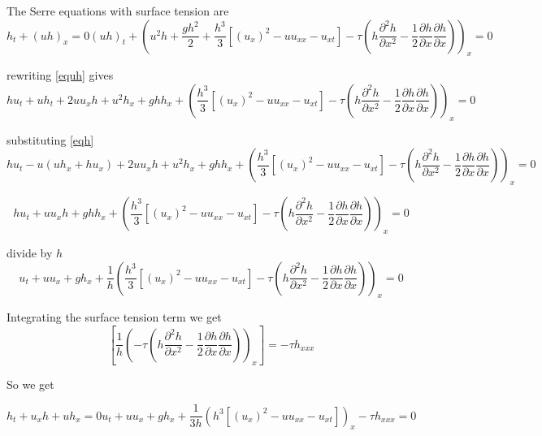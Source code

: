 \documentclass[subeqn]{article}
\begin{document}
The Serre equations with surface tension are
\begin{subequations}
	\begin{equation}
	\label{eqh}
	h_t + (uh)_x = 0
	\end{equation}
	\begin{equation}
	\label{equh}
	(uh)_t + \left(u^2h + \frac{gh^2}{2} + \frac{h^3}{3} \left[\left(u_x \right)^2 - uu_{xx} - u_{xt} \right] - \tau\left( h \frac{\partial^2 h}{\partial x^2} - \frac{1}{2}\frac{\partial h}{\partial x}\frac{\partial h}{\partial x} \right) \right)_x = 0
	\end{equation}
\end{subequations}

rewriting \eqref{equh} gives
\[hu_t + uh_t + 2u u_x h + u^2h_x + ghh_x + \left(\frac{h^3}{3} \left[\left(u_x \right)^2 - uu_{xx} - u_{xt} \right]  - \tau\left( h \frac{\partial^2 h}{\partial x^2} - \frac{1}{2}\frac{\partial h}{\partial x}\frac{\partial h}{\partial x} \right) \right)_x  = 0\]

substituting  \eqref{eqh}
\[hu_t - u\left(uh_x + hu_x\right) + 2u u_x h + u^2h_x + ghh_x + \left(\frac{h^3}{3} \left[\left(u_x \right)^2 - uu_{xx} - u_{xt} \right]  - \tau\left( h \frac{\partial^2 h}{\partial x^2} - \frac{1}{2}\frac{\partial h}{\partial x}\frac{\partial h}{\partial x} \right) \right)_x = 0\]

\[hu_t +  u u_x h + ghh_x + \left(\frac{h^3}{3} \left[\left(u_x \right)^2 - uu_{xx} - u_{xt} \right] - \tau\left( h \frac{\partial^2 h}{\partial x^2} - \frac{1}{2}\frac{\partial h}{\partial x}\frac{\partial h}{\partial x} \right) \right)_x = 0\]

divide by $h$
\[u_t +  u u_x  + gh_x + \frac{1}{h} \left(\frac{h^3}{3} \left[\left(u_x \right)^2 - uu_{xx} - u_{xt} \right] - \tau\left( h \frac{\partial^2 h}{\partial x^2} - \frac{1}{2}\frac{\partial h}{\partial x}\frac{\partial h}{\partial x} \right)\right)_x = 0\]

Integrating the surface tension term we get 
\[\left[ \frac{1}{h} \left(- \tau\left( h \frac{\partial^2 h}{\partial x^2} - \frac{1}{2}\frac{\partial h}{\partial x}\frac{\partial h}{\partial x} \right)\right)_x \right] = -\tau h_{xxx}\]

So we get

\begin{subequations}
	\label{eqexp}
	\begin{equation}
	\label{eqhexp}
	h_t + u_xh + u h_x = 0
	\end{equation}
	\begin{equation}
	\label{equhexp}
	u_t +  u u_x  + gh_x + \frac{1}{3h} \left({h^3}\left[\left(u_x \right)^2 - uu_{xx} - u_{xt} \right] \right)_x -\tau h_{xxx} = 0	
	\end{equation}
\end{subequations}
\end{document}
